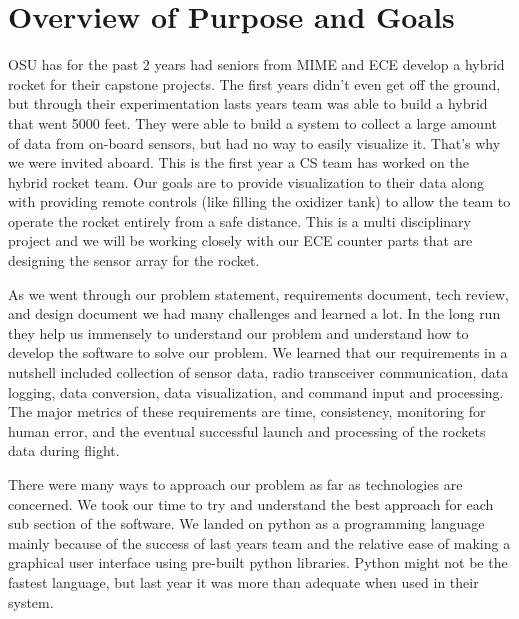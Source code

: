 \documentclass[10pt,draftclsnofoot,onecolumn]{IEEEtran}
\begin{document}
\section{Overview of Purpose and Goals}
OSU has for the past 2 years had seniors from MIME and ECE develop a hybrid rocket for their capstone projects. The first years didn't even get off the ground, but through their experimentation lasts years team was able to build a hybrid that went 5000 feet. They were able to build a system to collect a large amount of data from on-board sensors, but had no way to easily visualize it. That's why we were invited aboard. This is the first year a CS team has worked on the hybrid rocket team. Our goals are to provide visualization to their data along with providing remote controls (like filling the oxidizer tank) to allow the team to operate the rocket entirely from a safe distance. This is a multi disciplinary project and we will be working closely with our ECE counter parts that are designing the sensor array for the rocket. \par
As we went through our problem statement, requirements document, tech review, and design document we had many challenges and learned a lot. In the long run they help us immensely to understand our problem and understand how to develop the software to solve our problem. We learned that our requirements in a nutshell included collection of sensor data, radio transceiver communication, data logging, data conversion, data visualization, and command input and processing. The major metrics of these requirements are time, consistency, monitoring for human error, and the eventual successful launch and processing of the rockets data during flight. \par
There were many ways to approach our problem as far as technologies are concerned. We took our time to try and understand the best approach for each sub section of the software. We landed on python as a programming language mainly because of the success of last years team and the relative ease of making a graphical user interface using pre-built python libraries. Python might not be the fastest language, but last year it was more than adequate when used in their system. \par
\end{document}
